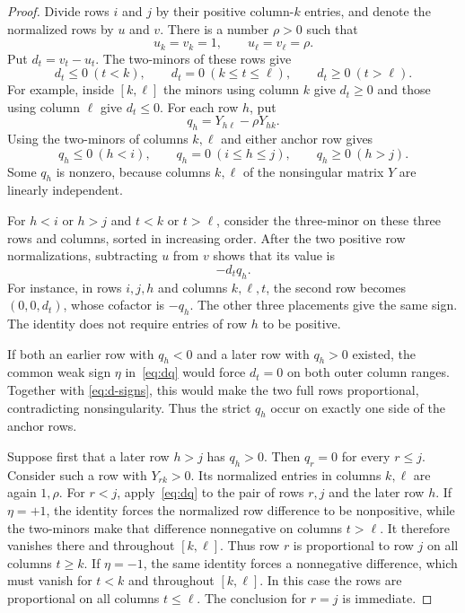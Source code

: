 \documentclass[10pt,a4paper]{article}
\theoremstyle{definition}
\theoremstyle{remark}
\numberwithin{equation}{section}
\begin{document}
\begin{proof}
Divide rows $i$ and $j$ by their positive column-$k$ entries, and
denote the normalized rows by $u$ and $v$. There is a number $\rho>0$
such that
\[
 u_k=v_k=1,\qquad u_\ell=v_\ell=\rho.
\]
Put $d_t=v_t-u_t$. The two-minors of these rows give
\begin{equation}\label{eq:d-signs}
 d_t\leq0\ (t<k),\qquad
 d_t=0\ (k\leq t\leq\ell),\qquad
 d_t\geq0\ (t>\ell).
\end{equation}
For example, inside $[k,\ell]$ the minors using column $k$ give
$d_t\geq0$ and those using column $\ell$ give $d_t\leq0$.
For each row $h$, put
\[
 q_h=Y_{h\ell}-\rho Y_{hk}.
\]
Using the two-minors of columns $k,\ell$ and either anchor row gives
\begin{equation}\label{eq:q-signs}
 q_h\leq0\ (h<i),\qquad
 q_h=0\ (i\leq h\leq j),\qquad
 q_h\geq0\ (h>j).
\end{equation}
Some $q_h$ is nonzero, because columns $k,\ell$ of the nonsingular
matrix $Y$ are linearly independent.

For $h<i$ or $h>j$ and $t<k$ or $t>\ell$, consider the three-minor
on these three rows and columns, sorted in increasing order. After
the two positive row normalizations, subtracting $u$ from $v$ shows
that its value is
\begin{equation}\label{eq:dq}
 -d_tq_h.
\end{equation}
For instance, in rows $i,j,h$ and columns $k,\ell,t$, the second row
becomes $(0,0,d_t)$, whose cofactor is $-q_h$.
The other three placements give the same sign. The identity does not
require entries of row $h$ to be positive.

If both an earlier row with $q_h<0$ and a later row with $q_h>0$
existed, the common weak sign $\eta$ in~\eqref{eq:dq} would force
$d_t=0$ on both outer column ranges. Together with
\eqref{eq:d-signs}, this would make the two full rows proportional,
contradicting nonsingularity. Thus the strict $q_h$ occur on exactly
one side of the anchor rows.

Suppose first that a later row $h>j$ has $q_h>0$. Then $q_r=0$
for every $r\leq j$. Consider such a row with $Y_{rk}>0$.
Its normalized entries in columns $k,\ell$ are again $1,\rho$.
For $r<j$, apply~\eqref{eq:dq} to the pair of rows $r,j$ and
the later row $h$. If $\eta=+1$, the identity forces the normalized
row difference to be nonpositive, while the two-minors make that
difference nonnegative on columns $t>\ell$. It therefore vanishes
there and throughout $[k,\ell]$. Thus row $r$ is proportional to
row $j$ on all columns $t\geq k$. If $\eta=-1$, the same identity
forces a nonnegative difference, which must vanish for $t<k$ and
throughout $[k,\ell]$. In this case the rows are proportional on
all columns $t\leq\ell$. The conclusion for $r=j$ is immediate.


\end{proof}
\end{document}
